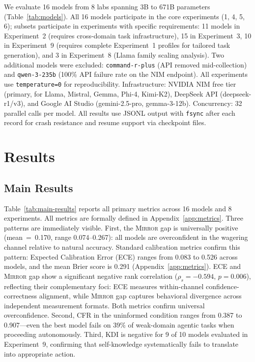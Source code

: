\documentclass[10pt]{article}
\newcommand{\mirror}{\textsc{Mirror}}
\newcommand{\KDI}{KDI}
\newcommand{\CFR}{CFR}
\begin{document}
We evaluate 16 models from 8 labs spanning 3B to 671B parameters
(Table~\ref{tab:models}). All 16 models participate in the core experiments (1, 4, 5, 6); subsets participate in experiments with specific requirements: 11 models in Experiment~2 (requires cross-domain task infrastructure), 15 in Experiment~3, 10 in Experiment~9 (requires complete Experiment~1 profiles for tailored task generation), and 3 in Experiment~8 (Llama family scaling analysis). Two additional models were excluded:
\texttt{command-r-plus} (API removed mid-collection) and \texttt{qwen-3-235b}
(100\% API failure rate on the NIM endpoint). All experiments use
\texttt{temperature=0} for reproducibility. Infrastructure: NVIDIA NIM free tier
(primary, for Llama, Mistral, Gemma, Phi-4, Kimi-K2), DeepSeek API
(deepseek-r1/v3), and Google AI Studio (gemini-2.5-pro, gemma-3-12b).
Concurrency: 32 parallel calls per model. All results use JSONL output with
\texttt{fsync} after each record for crash resistance and resume support via
checkpoint files.

\section{Results}
\label{sec:results}

\subsection{Main Results}

Table~\ref{tab:main-results} reports all primary metrics across 16 models and 8
experiments. All metrics are formally defined in Appendix~\ref{app:metrics}. Three patterns are immediately visible. First, the \mirror{} gap is
universally positive (mean~=~0.170, range 0.074--0.267): all models are
overconfident in the wagering channel relative to natural accuracy.
Standard calibration metrics confirm this pattern: Expected Calibration Error (ECE)
ranges from 0.083 to 0.526 across models, and the mean Brier score is 0.291
(Appendix~\ref{app:metrics}). ECE and \mirror{} gap show a significant negative
rank correlation ($\rho_s = -0.594$, $p = 0.006$), reflecting their
complementary foci: ECE measures within-channel confidence-correctness alignment,
while \mirror{} gap captures behavioral divergence across independent measurement
formats. Both metrics confirm universal overconfidence. Second, \CFR{}
in the uninformed condition ranges from 0.387 to 0.907---even the best model fails
on 39\% of weak-domain agentic tasks when proceeding autonomously. Third, \KDI{}
is negative for 9 of 10 models evaluated in Experiment~9, confirming that
self-knowledge systematically fails to translate into appropriate action.
\end{document}
